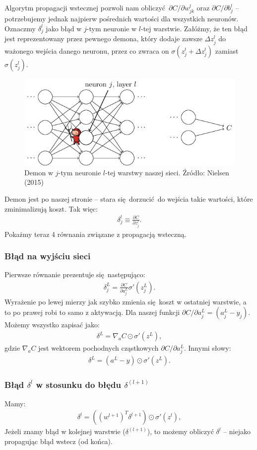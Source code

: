 \documentclass[10pt, oneside]{article}
\theoremstyle{remark}
\begin{document}
Algorytm propagacji wstecznej pozwoli nam obliczyć $\partial C / \partial w^l_{jk}$ oraz $\partial C / \partial b^l_{j}$ -- potrzebujemy jednak najpierw pośrednich wartości dla wszystkich neuronów.
Oznaczmy $\delta_j^l$ jako błąd w $j$-tym neuronie w $l$-tej warstwie.
Załóżmy, że ten błąd jest reprezentowany przez pewnego demona, który dodaje zawsze $\Delta z^l_j$ do ważonego wejścia danego neuronu, przez co zwraca on $\sigma(z^l_j+\Delta z^l_j)$ zamiast $\sigma(z^l_j)$.
\begin{figure}[!htpb]
	\centering
	\includegraphics[width=.5\linewidth]{figures/tikz19}
	\caption{Demon w $j$-tym neuronie $l$-tej warstwy naszej sieci. Źródło: Nielsen (2015)}
\end{figure}
Demon jest po naszej stronie -- stara się dorzucić do wejścia takie wartości, które zminimalizują koszt. 
Tak więc:
\begin{eqnarray} 
  \delta^l_j \equiv \frac{\partial C}{\partial z^l_j}.
\end{eqnarray}
Pokażmy teraz 4 równania związane z propagacją wsteczną.

\subsubsection{Błąd na wyjściu sieci}
Pierwsze równanie prezentuje się następująco:
\begin{eqnarray} 
  \delta^L_j = \frac{\partial C}{\partial a^L_j} \sigma'(z^L_j).
\end{eqnarray}
Wyrażenie po lewej mierzy jak szybko zmienia się koszt w ostatniej warstwie, a to po prawej robi to samo z aktywacją.
Dla naszej funkcji $\partial C / \partial a^L_j = (a_j^L-y_j)$.
Możemy wszystko zapisać jako:
\begin{eqnarray} 
  \delta^L = \nabla_a C \odot \sigma'(z^L),
\end{eqnarray}
gdzie $\nabla_a C$ jest wektorem pochodnych cząstkowych ${\partial C}/{\partial a^L_j}$.
Innymi słowy:
\begin{eqnarray} 
  \delta^L = (a^L-y) \odot \sigma'(z^L).
\end{eqnarray}
\subsubsection{Błąd $\delta^l$ w stosunku do błędu $\delta^(l+1)$}
Mamy:
\begin{eqnarray} 
  \delta^l = ((w^{l+1})^T \delta^{l+1}) \odot \sigma'(z^l),
\end{eqnarray}
Jeżeli znamy błąd w kolejnej warstwie ($\delta^(l+1)$), to możemy obliczyć $\delta^l$ -- niejako propagując błąd wstecz (od końca).
\end{document}
